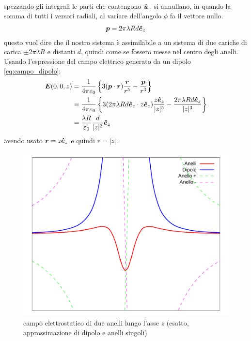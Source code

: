 \begin{Es}
\begin{equation*}
\end{equation*}
spezzando gli integrali le parti che contengono $\boldsymbol{\hat {u}}_r$ si annullano, in quando la somma di tutti i versori radiali, al variare dell'angolo $\phi$ fa il vettore nullo.
\begin{equation*}
 \boldsymbol{p} = 2\pi\lambda R d\boldsymbol{\hat {e}}_z
\end{equation*}
questo vuol dire che il nostro sistema è assimilabile a un sistema di due cariche di carica $\pm 2\pi\lambda R $ e distanti $d$, quindi come se fossero messe nel centro degli anelli. Usando l'espressione del campo elettrico generato da un dipolo \eqref{eq:campo_dipolo}:
\begin{align*}
 \boldsymbol{E}(0,0,z) &= \frac{1}{4\pi\varepsilon_0}\left\{3(\boldsymbol{p}\cdot\boldsymbol{r})\frac{\boldsymbol{r}}{r^5}-\frac{\boldsymbol{p}}{r^3}\right\}\\
              &= \frac{1}{4\pi\varepsilon_0}\left\{3(2\pi\lambda R d\boldsymbol{\hat {e}}_z\cdot z\boldsymbol{\hat {e}}_z)\frac{z\boldsymbol{\hat {e}}_z}{|z|^5}-\frac{2\pi\lambda R d\boldsymbol{\hat {e}}_z}{|z|^3}\right\}\\
              &= \frac{\lambda R}{\varepsilon_0}\frac{d}{|z|^3}\boldsymbol{\hat {e}}_z
\end{align*}
avendo usato $\boldsymbol{r}=z\boldsymbol{\hat {e}}_z$ e quindi $r = |z|$.
\begin{figure}[htbp]
 \centering
 \includegraphics[scale=0.5]{immagini/fisica2/due_anelli}
 \caption{campo elettrostatico di due anelli lungo l'asse $z$ (esatto, approssimazione di dipolo e anelli singoli)}
\end{figure}
\end{Es}
